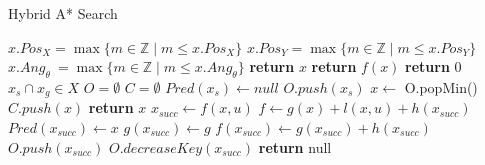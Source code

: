 \begin{algorithm}
    \caption{Hybrid A* Search}\label{HA*}
    \begin{algorithmic}[1]
            \State $x.Pos_X = \max\{m\in\mathbb{Z}\mid m\le x.Pos_X\}$
            \State $x.Pos_Y = \max\{m\in\mathbb{Z}\mid m\le x.Pos_Y\}$
            \State $x.Ang_\theta\ =\max\{m\in\mathbb{Z}\mid m\le x.Ang_\theta\}$
            \State \textbf{return} $x$
        \EndFunction
        \Statex
                \State \textbf{return} $f(x)$
            \Else
                \State \textbf{return} 0
            \EndIf
        \EndFunction
        \Statex
        \Require $x_s \cap x_g \in X$
        \State $O = \emptyset$ \label{HA*start}
        \State $C = \emptyset$
        \State $Pred(x_s) \gets null$
        \State $O.push(x_s)$
         \label{HA*while}
            \State $x \gets$ O.popMin()
            \State $C.push(x)$
                \State \textbf{return} $x$ \label{HA*solution}
            \Else
                \State $x_{succ} \gets f(x,u)$
                        \State $f \gets g(x) + l(x,u) + h(x_{succ})$
                            \State $Pred(x_{succ}) \gets x$
                            \State $g(x_{succ}) \gets g$
                            \State $f(x_{succ}) \gets g(x_{succ}) + h(x_{succ})$
                                \State $O.push(x_{succ})$
                            \Else
                                \State $O.decreaseKey(x_{succ})$
                            \EndIf
                        \EndIf
                    \EndIf
                \EndFor
            \EndIf
        \EndWhile
        \State \textbf{return} null
    \end{algorithmic}
\end{algorithm}